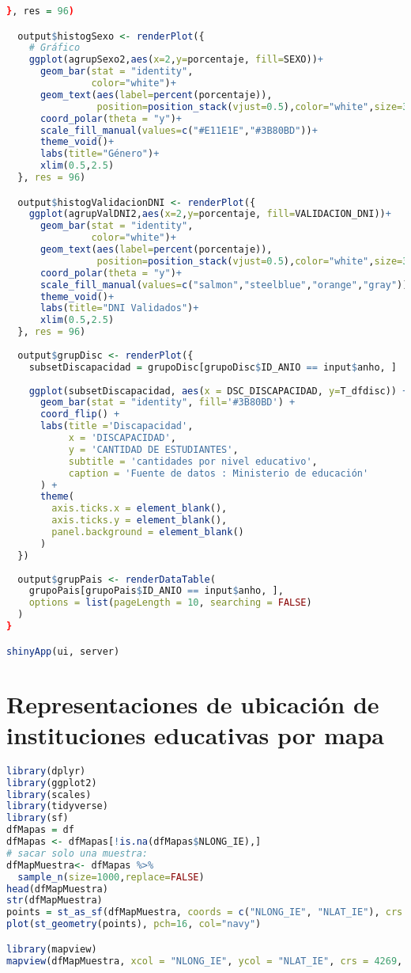 \begin{lstlisting}[language=R]
  }, res = 96)

  output$histogSexo <- renderPlot({
    # Gráfico
    ggplot(agrupSexo2,aes(x=2,y=porcentaje, fill=SEXO))+
      geom_bar(stat = "identity",
               color="white")+
      geom_text(aes(label=percent(porcentaje)),
                position=position_stack(vjust=0.5),color="white",size=3)+
      coord_polar(theta = "y")+
      scale_fill_manual(values=c("#E11E1E","#3B80BD"))+
      theme_void()+
      labs(title="Género")+
      xlim(0.5,2.5)
  }, res = 96)

  output$histogValidacionDNI <- renderPlot({
    ggplot(agrupValDNI2,aes(x=2,y=porcentaje, fill=VALIDACION_DNI))+
      geom_bar(stat = "identity",
               color="white")+
      geom_text(aes(label=percent(porcentaje)),
                position=position_stack(vjust=0.5),color="white",size=3)+
      coord_polar(theta = "y")+
      scale_fill_manual(values=c("salmon","steelblue","orange","gray"))+
      theme_void()+
      labs(title="DNI Validados")+
      xlim(0.5,2.5)
  }, res = 96)
  
  output$grupDisc <- renderPlot({
    subsetDiscapacidad = grupoDisc[grupoDisc$ID_ANIO == input$anho, ]
    
    ggplot(subsetDiscapacidad, aes(x = DSC_DISCAPACIDAD, y=T_dfdisc)) +
      geom_bar(stat = "identity", fill='#3B80BD') +
      coord_flip() +
      labs(title ='Discapacidad',
           x = 'DISCAPACIDAD',
           y = 'CANTIDAD DE ESTUDIANTES',
           subtitle = 'cantidades por nivel educativo',
           caption = 'Fuente de datos : Ministerio de educación'
      ) +
      theme(
        axis.ticks.x = element_blank(),
        axis.ticks.y = element_blank(),
        panel.background = element_blank()
      ) 
  })
  
  output$grupPais <- renderDataTable(
    grupoPais[grupoPais$ID_ANIO == input$anho, ],
    options = list(pageLength = 10, searching = FALSE)
  )
}

shinyApp(ui, server)
\end{lstlisting}

\section{Representaciones de ubicación de instituciones educativas por mapa}\label{cod_mapas}
\begin{lstlisting}[language=R]
library(dplyr)
library(ggplot2)
library(scales)
library(tidyverse)
library(sf)
dfMapas = df
dfMapas <- dfMapas[!is.na(dfMapas$NLONG_IE),]
# sacar solo una muestra:
dfMapMuestra<- dfMapas %>%
  sample_n(size=1000,replace=FALSE)
head(dfMapMuestra)
str(dfMapMuestra)
points = st_as_sf(dfMapMuestra, coords = c("NLONG_IE", "NLAT_IE"), crs = 4326)
plot(st_geometry(points), pch=16, col="navy")

library(mapview)
mapview(dfMapMuestra, xcol = "NLONG_IE", ycol = "NLAT_IE", crs = 4269, grid = FALSE)
\end{lstlisting}